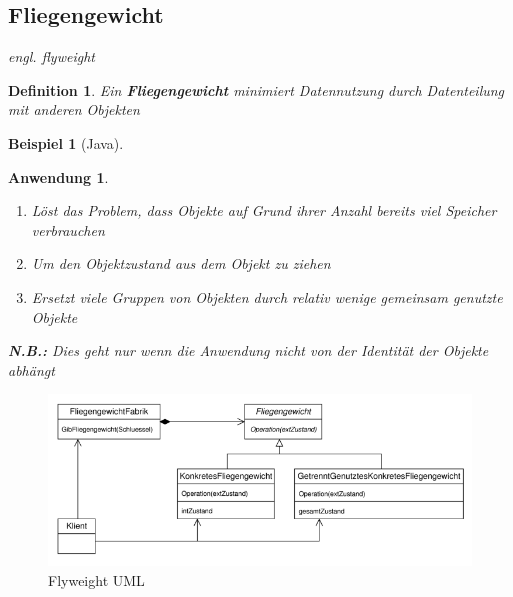 \documentclass[a4paper]{article}
\theoremstyle{break}
\newtheorem{defi}{Definition}[section]
\newtheorem{ex}{Beispiel}[section]
\newtheorem{why}{Anwendung}[section]
\begin{document}
\subsection{Fliegengewicht}
\textit{engl. flyweight}
\begin{defi}
	Ein \textbf{Fliegengewicht} minimiert Datennutzung durch Datenteilung mit anderen Objekten
\end{defi}
\begin{ex}[Java]
	
	
\end{ex}
\begin{why}
	\begin{enumerate}
		\item Löst das Problem, dass Objekte auf Grund ihrer Anzahl bereits viel Speicher verbrauchen
		\item Um den Objektzustand aus dem Objekt zu ziehen
		\item Ersetzt viele Gruppen von Objekten durch relativ wenige gemeinsam genutzte Objekte
	\end{enumerate}
	\textbf{N.B.:} Dies geht nur wenn die Anwendung nicht von der Identität der Objekte abhängt
\end{why}
\begin{figure}[H]
	\centering
	\includegraphics[width=\textwidth]{../diagrams/uml/FlyweightPattern.png}
	\caption{Flyweight UML}
\end{figure}


\newpage
\end{document}
